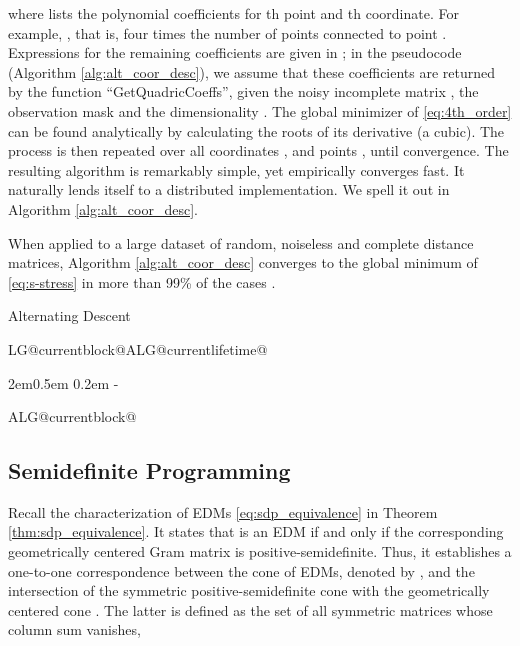 \documentclass[10pt,double]{IEEEtran}
\makeatletter
\providecommand{\mat}[1]{\ensuremath{\boldsymbol{#1}}}
\providecommand{\mX}{\mat{X}}\providecommand{\mY}{\mat{Y}}
\newcommand{\rev}[1]{{#1}}
\newlength{\continueindent}
\renewenvironment{algorithmic}[1][0]{\edef\ALG@numberfreq{#1}\def\@currentlabel{\theALG@line}\setcounter{ALG@line}{0}\setcounter{ALG@rem}{0}\let\\\algbreak \expandafter\edef\csname ALG@currentblock@\theALG@nested\endcsname{0}\expandafter\let\csname ALG@currentlifetime@\theALG@nested\endcsname\relax \begin{list}{\ALG@step}{\rightmargin\z@ \itemsep\z@ \itemindent\z@ \listparindent2em\partopsep\z@ \parskip\z@ \parsep\z@ \labelsep 0.5em \topsep 0.2em\ifthenelse{\equal{#1}{0}}{\labelwidth 0.5em}{\labelwidth 1.2em}\leftmargin\labelwidth \addtolength{\leftmargin}{\labelsep}
      \ALG@tlm\z@ }\parshape 2 \leftmargin \linewidth \continueindent \dimexpr\linewidth-\continueindent\relax
   \setcounter{ALG@nested}{0}\ALG@beginalgorithmic }{\ALG@closeloops \expandafter\ifnum\csname ALG@currentblock@\theALG@nested\endcsname=0\relax \else \PackageError{algorithmicx}{Some blocks are not closed!!!}{}\fi \ALG@endalgorithmic \end{list}}\makeatother
\makeatother
\begin{document}
where  lists the polynomial coefficients for th point
and th coordinate. For example, , that
is, four times the number of points connected to point . Expressions for
the remaining coefficients are given in \cite{rezathesis13}; \rev{in the
pseudocode (Algorithm
\ref{alg:alt_coor_desc}), we assume that these coefficients are returned by the
function ``GetQuadricCoeffs'', given the noisy incomplete matrix , the
observation mask  and the dimensionality }. The global minimizer of
\eqref{eq:4th_order} can be found analytically by calculating the roots of its
derivative (a cubic). The process is then repeated over all coordinates ,
and points , until convergence. The resulting algorithm is remarkably
simple, yet empirically converges fast. It naturally lends itself to a
distributed implementation. We spell it out in Algorithm
\ref{alg:alt_coor_desc}.

When applied to a large dataset of random, noiseless and complete distance
matrices, Algorithm \ref{alg:alt_coor_desc} converges to the global minimum of
\eqref{eq:s-stress} in more than 99\% of the cases \cite{rezathesis13}.

\begin{algorithm}[t]
\caption{Alternating Descent \cite{rezathesis13}}
\label{alg:alt_coor_desc} 
\begin{algorithmic}[1]

	\State  {}
	\Repeat
		\For{} 
			\For{} 
				\State 
				\State   {}
			\EndFor
		\EndFor
	\State \Return{\mX}
\EndFunction
\end{algorithmic}
\end{algorithm}


\subsection{Semidefinite Programming} \label{sub:semidefinite_programming}

Recall the characterization of EDMs \eqref{eq:sdp_equivalence} in Theorem
\ref{thm:sdp_equivalence}. It states that  is an EDM if and only if the
corresponding geometrically centered Gram matrix  is
positive-semidefinite. Thus, it establishes a one-to-one correspondence
between the cone of EDMs, denoted by , and the intersection of the
symmetric positive-semidefinite cone  with the geometrically centered
cone . The latter is defined as the set of all symmetric matrices
whose column sum vanishes,
\end{document}
